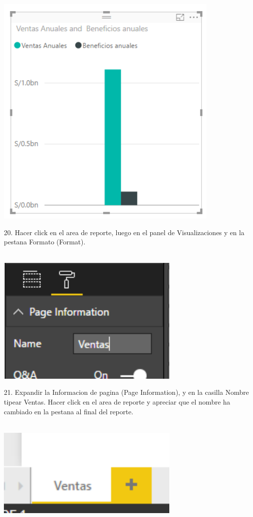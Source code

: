 \documentclass[12pt,letterpaper]{article}
\begin{document}
\begin{center}
\includegraphics[width=11cm]{IMG/38.png} 
\end{center}
20. Hacer click en el area de reporte, luego en el panel de Visualizaciones y en la pestana Formato (Format).\\\\
\begin{center}
\includegraphics[width=9cm]{IMG/39.png} 
\end{center}
21. Expandir la Informacion de pagina (Page Information), y en la casilla Nombre tipear Ventas. Hacer click en el
area de reporte y apreciar que el nombre ha cambiado en la pestana al final del reporte.\\\\
\begin{center}
\includegraphics[width=9cm]{IMG/40.png} 
\end{center}
\end{document}
